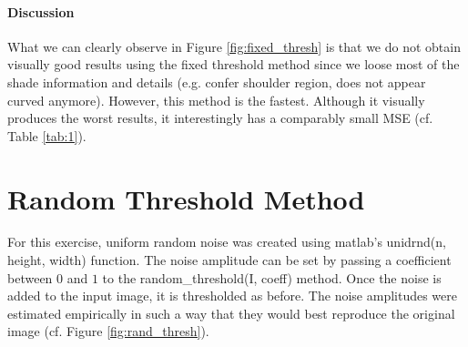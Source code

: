 \documentclass{article}
\begin{document}
\paragraph{Discussion} What we can clearly observe in Figure \ref{fig:fixed_thresh} is that we do not obtain visually good results using the fixed threshold method since we loose most of the shade information and details (e.g. confer shoulder region, does not appear curved anymore). However, this method is the fastest. Although it visually produces the worst results, it interestingly has a comparably small MSE (cf. Table \ref{tab:1}). 

\section{Random Threshold Method}
For this exercise, uniform random noise was created using matlab's \textsf{unidrnd(n, height, width)} function. The noise amplitude can be set by passing a coefficient between $0$ and $1$ to the \textsf{random\_threshold(I, coeff)} method. Once the noise is added to the input image, it is thresholded as before. The noise amplitudes were estimated empirically in such a way that they would best reproduce the original image (cf. Figure \ref{fig:rand_thresh}).
\end{document}
